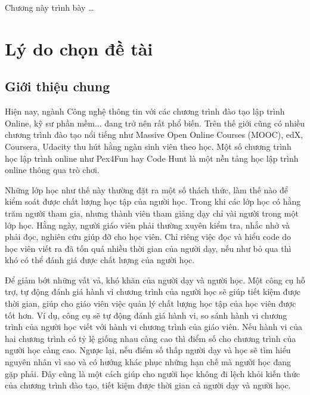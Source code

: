 
Chương này trình bày \dots


\section{Lý do chọn đề tài}

\subsection{Giới thiệu chung}

Hiện nay, ngành Công nghệ thông tin với các chương trình đào tạo lập trình Online, kỹ sư phần mềm... đang trở nên rất phổ biến. Trên thế giới cũng có nhiều chương trình đào tạo nổi tiếng như Massive Open Online Courses (MOOC), edX, Coursera, Udacity  thu hút hằng ngàn sinh viên theo học. Một số chương trình học lập trình online như Pex4Fun hay Code Hunt là một nền tảng học lập trình online thông qua trò chơi.

Những lớp học như thế này thường đặt ra một số thách thức, làm thế nào để kiểm soát được chất lượng học tập của người học. Trong khi các lớp học có hằng trăm người tham gia, nhưng thành viên tham giảng dạy chỉ vài người trong một lớp học. Hằng ngày, người giáo viên phải thường xuyên kiểm tra, nhắc nhở và phải đọc, nghiên cứu giúp đỡ cho học viên. Chỉ riêng việc đọc và hiểu code do học viên viết ra đã tốn quá nhiều thời gian của người dạy, nếu như bỏ qua thì khó có thể đánh giá được chất lượng của người học.\\ 

Để giảm bớt những vất vả, khó khăn của người dạy và người học. Một công cụ hỗ trợ, tự động đánh giá hành vi chương trình của người học sẽ giúp tiết kiệm được thời gian, giúp cho giáo viên việc quản lý chất lượng học tập của học viên được tốt hơn. Ví dụ, công cụ sẽ tự động đánh giá hành vi, so sánh hành vi chương trình của người học viết với hành vi chương trình của giáo viên. Nếu hành vi của hai chương trình có tỷ lệ giống nhau càng cao thì điểm số cho chương trình của người học càng cao. Ngược lại, nếu điểm số thấp người dạy và học sẽ tìm hiểu nguyên nhân vì sao và có hướng khác phục những hạn chế mà người học đang gặp phải. Đây cũng là một cách giúp cho người học không đi lệch khỏi kiến thức của chương trình đào tạo, tiết kiệm được thời gian cả người dạy và người học.\\

